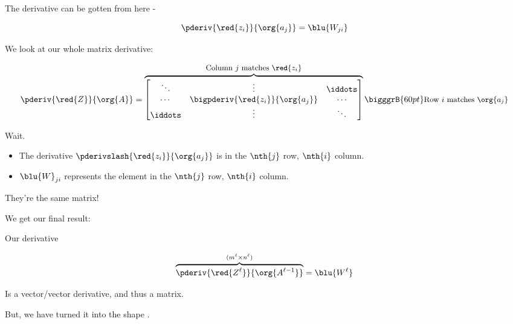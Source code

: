         The derivative can be gotten from here -
        
        \begin{equation}
            \pderiv{ \red{z_i} }{ \org{a_j}  } =  \blu{W_{ji}}
        \end{equation}
        
        We look at our whole matrix derivative:

        
        \begin{equation}
            \pderiv{ \red{Z} }{ \org{A} } 
            =
            \overbrace{
                \begin{bmatrix}
                    \ddots &  \vdots                               & \iddots \\
                    \cdots & \bigpderiv{ \red{z_i} }{ \org{a_j}  } & \cdots \\
                    \iddots& \vdots                                & \ddots
                \end{bmatrix}
                }^{ \text{\small Column $j$ matches $\red{z_i}$} }
            \bigggrB{60pt} \text{\small Row $i$ matches $\org{a_j}$} 
        \end{equation}
        
        Wait. 
        \begin{itemize}
            \item The derivative $\pderivslash{ \red{z_i} }{ \org{a_j}  }$ is in the $\nth{j}$ row, $\nth{i}$ column.
            
            \item $\blu{W}_{ji}$ represents the element in the $\nth{j}$ row, $\nth{i}$ column.
        \end{itemize}
        
        They're the same matrix!
            
        We get our final result:\\
        
        
        \begin{notation}
            Our derivative
            
            \begin{equation*}
                \overbrace{
                    \pderiv{\red{Z^\ell}} {\org{A^{\ell-1}}}
                }^{ (m^{\ell} \times n^{\ell}) }
                =
                \blu{W^\ell}
            \end{equation*}
        
            Is a vector/vector derivative, and thus a matrix.
            
            But, we have turned it into the shape .
        \end{notation}
            
